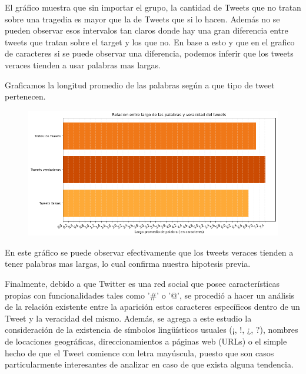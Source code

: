\documentclass[titlepage,a4paper]{article}
\begin{document}
    El gráfico muestra que sin importar el grupo, la cantidad de Tweets que no tratan sobre una tragedia es mayor que la de Tweets que si lo hacen. Además no se pueden observar esos intervalos tan claros donde hay una gran diferencia entre tweets que tratan sobre el target y los que no. En base a esto y que en el grafico de caracteres si se puede observar una diferencia, podemos inferir que los tweets veraces tienden a usar palabras mas largas.
    
    Graficamos la longitud promedio de las palabras según a que tipo de tweet pertenecen. 
    
     \begin{figure}[H]
    \centering
    \includegraphics[width=1\textwidth]{graficos/Analisis Lexico Grafico/longitud promedio barras.png}
    \caption{}
    \end{figure}

    En este gráfico se puede observar efectivamente que los tweets veraces tienden a tener palabras mas largas, lo cual confirma nuestra hipotesis previa.

    
    Finalmente, debido a que Twitter es una red social que posee características propias con funcionalidades tales como '\#' o '@', se procedió a hacer un análisis de la relación existente entre la aparición estos caracteres específicos dentro de un Tweet y la veracidad del mismo. Además, se agrega a este estudio la consideración de la existencia de símbolos lingüísticos usuales (¡, !, ¿, ?), nombres de locaciones geográficas, direccionamientos a páginas web (URLs) o el simple hecho de que el Tweet comience con letra mayúscula, puesto que son casos particularmente interesantes de analizar en caso de que exista alguna tendencia.
\end{document}
